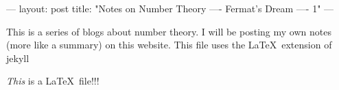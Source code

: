 ---
layout: post
title: "Notes on Number Theory ---- Fermat's Dream ---- 1"
---

This is a series of blogs about number theory. I will be posting my own notes (more like a summary) on this website. 
This file uses the \LaTeX\ extension of jekyll

\emph{This} is a \LaTeX\  file!!!
